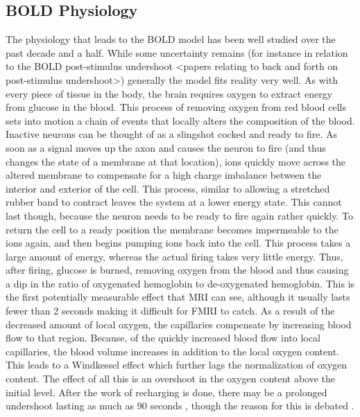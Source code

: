 \documentclass{article}
\begin{document}
\subsection*{BOLD Physiology}
The physiology that leads to the BOLD model has been well studied over the 
past decade and a half. While some uncertainty remains (for instance in
relation to the BOLD post-stimulus undershoot <papers relating to back and
forth on post-stimulus undershoot>) generally the model fits reality very 
well. As with every piece of tissue in the body, the brain requires oxygen
to extract energy from glucose in the blood. This process of removing oxygen
from red blood cells sets into motion a chain of events that locally 
alters the composition of the blood. Inactive neurons can be thought of
as a slingshot cocked and ready to fire. As soon as a signal moves up
the axon and causes the neuron to fire (and thus changes the state
of a membrane at that location), ions quickly move across the altered
membrane to compensate for a high charge imbalance between the interior
and exterior of the cell. This process, similar to allowing a stretched
rubber band to contract leaves the system at a lower energy state. This cannot
last though, because the neuron needs to be ready to fire again rather quickly.
To return the cell to a ready position the membrane becomes impermeable
to the ions again, and then begins pumping ions back into the cell. This
process takes a large amount of energy, whereas the actual firing takes
very little energy. Thus, after firing, glucose is burned, removing oxygen
from the blood and thus causing a dip in the ratio of oxygenated hemoglobin to 
de-oxygenated hemoglobin. This is the first potentially measurable effect
that MRI can see, although it usually lasts fewer than 2 seconds making it
difficult for FMRI to catch. As a result of the decreased amount of local oxygen,
the capillaries compensate by increasing blood flow to that region. Because,
of the quickly increased blood flow into local capillaries, the blood
volume increases in addition to the local oxygen content. This leads to a Windkessel
effect which further lags the normalization of oxygen content. The effect of
all this is an overshoot in the oxygen content above the initial level. After
the work of recharging is done, there may be a prolonged undershoot lasting
as much as 90 seconds \cite{spatial_poststim}, though the reason for this
is debated \cite{origin_poststim}.
\end{document}
